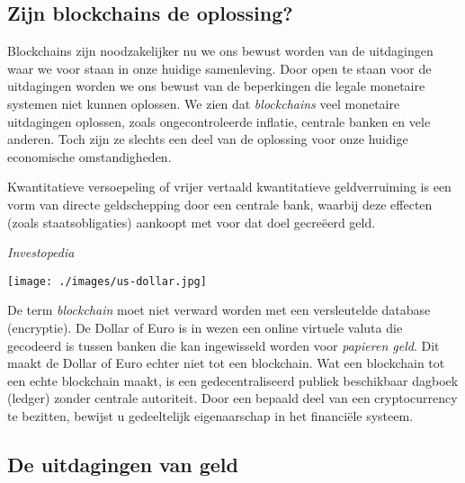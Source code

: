 \documentclass[11pt]{article}
\begin{document}
\subsection{Zijn blockchains de oplossing?}

Blockchains zijn noodzakelijker nu we ons bewust worden van de uitdagingen waar we voor staan ​​in onze huidige samenleving. Door open te staan voor de uitdagingen worden we ons bewust van de beperkingen die legale monetaire systemen niet kunnen oplossen. We zien dat \textit{blockchains} veel monetaire uitdagingen oplossen, zoals ongecontroleerde inflatie, centrale banken en vele anderen. Toch zijn ze slechts een deel van de oplossing voor onze huidige economische omstandigheden.

\epigraph{Kwantitatieve versoepeling of vrijer vertaald kwantitatieve geldverruiming is een vorm van directe geldschepping door een centrale bank, waarbij deze effecten (zoals staatsobligaties) aankoopt met voor dat doel gecre\"eerd geld.}{\textit{Investopedia}}

\vspace{-138pt}
\hspace{-25pt}
\texttt{[image: ./images/us-dollar.jpg]}
\vspace{5pt}

\noindent
De term \textit{blockchain} moet niet verward worden met een versleutelde database (encryptie). De Dollar of Euro is in wezen een online virtuele valuta die gecodeerd is tussen banken die kan ingewisseld worden voor \textit{papieren geld}. Dit maakt de Dollar of Euro echter niet tot een blockchain. Wat een blockchain tot een echte blockchain maakt, is een gedecentraliseerd publiek beschikbaar dagboek (ledger)  zonder centrale autoriteit. 
Door een bepaald deel van een cryptocurrency te bezitten, bewijst u gedeeltelijk eigenaarschap in het financi\"ele systeem.


\subsection{De uitdagingen van geld}
\end{document}

